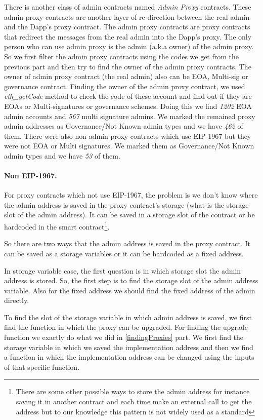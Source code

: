 There is another class of admin contracts named \textit{Admin Proxy} contracts. These admin proxy contracts are another layer of re-direction between the real admin and the Dapp's proxy contract. The admin proxy contracts are proxy contracts that redirect the messages from the real admin into the Dapp's proxy. The only person who can use admin proxy is the admin (a.k.a owner) of the admin proxy. So we first filter the admin proxy contracts using the codes we get from the previous part and then try to find the owner of the admin proxy contracts. The owner of admin proxy contract (the real admin) also can be EOA, Multi-sig or governance contract. Finding the owner of the admin proxy contract, we used \textit{eth\_getCode} method to check the code of these account and find out if they are EOAs or Multi-signatures or governance schemes. Doing this we find \textit{1202} EOA admin accounts and \textit{567} multi signature admins. We marked the remained proxy admin addresses as Governance/Not Known admin types and we have \textit{462} of them. There were also non admin proxy contracts which use EIP-1967 but they were not EOA or Multi signatures. We marked them as Governance/Not Known admin types and we have \textit{53} of them.


\paragraph{Non EIP-1967.}

For proxy contracts which not use EIP-1967, the problem is we don't know where the admin address is saved in the proxy contract's storage (what is the storage slot of the admin address). It can be saved in a storage slot of the contract or be hardcoded in the smart contract\footnote{There are some other possible ways to store the admin address for instance saving it in another contract and each time make an external call to get the address but to our knowledge this pattern is not widely used as a standard}. 

So there are two ways that the admin address is saved in the proxy contract. It can be saved as a storage variables or it can be hardcoded as a fixed address.

In storage variable case, the first question is in which storage slot the admin address is stored. So, the first step is to find the storage slot of the admin address variable. Also for the fixed address we should find the fixed address of the admin directly.

To find the slot of the storage variable in which admin address is saved, we first find the function in which the proxy can be upgraded. For finding the upgrade function we exactly do what we did in \ref{findingProxies} part. We first find the storage variable in which we saved the implementation address and then we find a function in which the implementation address can be changed using the inputs of that specific function. 

